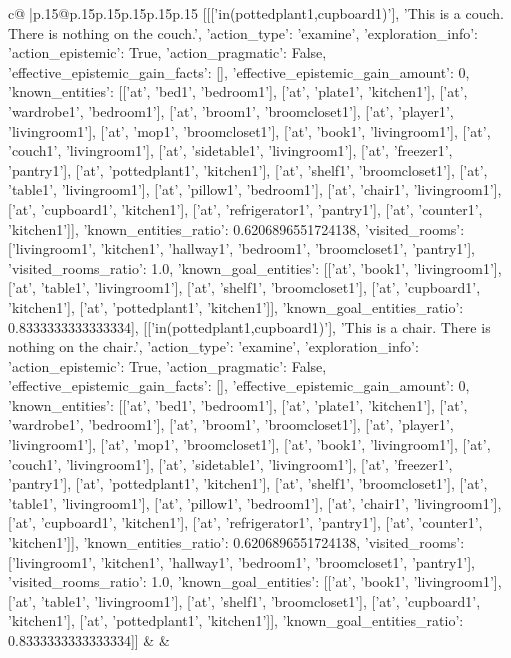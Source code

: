 \documentclass{article}
\begin{document}
{\begin{supertabular}{c@{$\;$}|p{.15\linewidth}@{}p{.15\linewidth}p{.15\linewidth}p{.15\linewidth}p{.15\linewidth}p{.15\linewidth}}
{{{	 [[['in(pottedplant1,cupboard1)'], 'This is a couch. There is nothing on the couch.', {'action_type': 'examine', 'exploration_info': {'action_epistemic': True, 'action_pragmatic': False, 'effective_epistemic_gain_facts': [], 'effective_epistemic_gain_amount': 0, 'known_entities': [['at', 'bed1', 'bedroom1'], ['at', 'plate1', 'kitchen1'], ['at', 'wardrobe1', 'bedroom1'], ['at', 'broom1', 'broomcloset1'], ['at', 'player1', 'livingroom1'], ['at', 'mop1', 'broomcloset1'], ['at', 'book1', 'livingroom1'], ['at', 'couch1', 'livingroom1'], ['at', 'sidetable1', 'livingroom1'], ['at', 'freezer1', 'pantry1'], ['at', 'pottedplant1', 'kitchen1'], ['at', 'shelf1', 'broomcloset1'], ['at', 'table1', 'livingroom1'], ['at', 'pillow1', 'bedroom1'], ['at', 'chair1', 'livingroom1'], ['at', 'cupboard1', 'kitchen1'], ['at', 'refrigerator1', 'pantry1'], ['at', 'counter1', 'kitchen1']], 'known_entities_ratio': 0.6206896551724138, 'visited_rooms': ['livingroom1', 'kitchen1', 'hallway1', 'bedroom1', 'broomcloset1', 'pantry1'], 'visited_rooms_ratio': 1.0, 'known_goal_entities': [['at', 'book1', 'livingroom1'], ['at', 'table1', 'livingroom1'], ['at', 'shelf1', 'broomcloset1'], ['at', 'cupboard1', 'kitchen1'], ['at', 'pottedplant1', 'kitchen1']], 'known_goal_entities_ratio': 0.8333333333333334}}], [['in(pottedplant1,cupboard1)'], 'This is a chair. There is nothing on the chair.', {'action_type': 'examine', 'exploration_info': {'action_epistemic': True, 'action_pragmatic': False, 'effective_epistemic_gain_facts': [], 'effective_epistemic_gain_amount': 0, 'known_entities': [['at', 'bed1', 'bedroom1'], ['at', 'plate1', 'kitchen1'], ['at', 'wardrobe1', 'bedroom1'], ['at', 'broom1', 'broomcloset1'], ['at', 'player1', 'livingroom1'], ['at', 'mop1', 'broomcloset1'], ['at', 'book1', 'livingroom1'], ['at', 'couch1', 'livingroom1'], ['at', 'sidetable1', 'livingroom1'], ['at', 'freezer1', 'pantry1'], ['at', 'pottedplant1', 'kitchen1'], ['at', 'shelf1', 'broomcloset1'], ['at', 'table1', 'livingroom1'], ['at', 'pillow1', 'bedroom1'], ['at', 'chair1', 'livingroom1'], ['at', 'cupboard1', 'kitchen1'], ['at', 'refrigerator1', 'pantry1'], ['at', 'counter1', 'kitchen1']], 'known_entities_ratio': 0.6206896551724138, 'visited_rooms': ['livingroom1', 'kitchen1', 'hallway1', 'bedroom1', 'broomcloset1', 'pantry1'], 'visited_rooms_ratio': 1.0, 'known_goal_entities': [['at', 'book1', 'livingroom1'], ['at', 'table1', 'livingroom1'], ['at', 'shelf1', 'broomcloset1'], ['at', 'cupboard1', 'kitchen1'], ['at', 'pottedplant1', 'kitchen1']], 'known_goal_entities_ratio': 0.8333333333333334}}]] 
	  } 
	   } 
	   } 
	 & & \\ 
 


\end{supertabular}}
\end{document}
